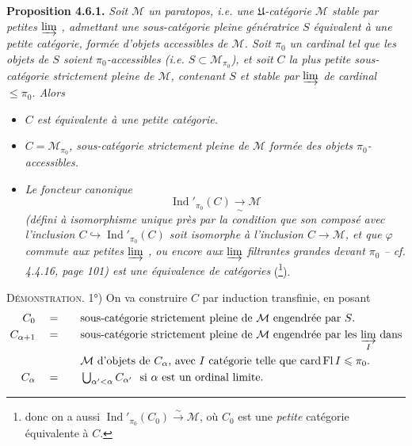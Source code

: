 \documentclass[11pt]{article}
\newcommand{\msp}[1]{\marginpar{\footnotesize [#1]}}
\newcommand{\Ind}{\operatorname{Ind}}
\begin{document}
\textbf{Proposition 4.6.1.} \textit{Soit $\mathcal{M}$ un paratopos, i.e. une $\mathfrak{U}$-catégorie $\mathcal{M}$ stable par petites $\varinjlim$ , admettant une sous-catégorie pleine génératrice $S$ équivalent à une petite catégorie, formée d'objets accessibles de $\mathcal{M}$. Soit $\pi_0$ un cardinal tel que les objets de $S$ soient $\pi_0$-accessibles (i.e. $S\subset\mathcal{M}_{\pi_0}$), et soit $C$ la plus petite sous-catégorie strictement pleine de $\mathcal{M}$, contenant $S$ et stable par $\varinjlim$ de cardinal $\leqslant\pi_0$. Alors} %
\begin{itemize}[leftmargin=2.5em]
\item[\textit{1°)}] \textit{$C$ est équivalente à une petite catégorie.}

\msp{page 140}

\item[\textit{2°)}] \textit{$C=\mathcal{M}_{\pi_0}$, sous-catégorie strictement pleine de $\mathcal{M}$ formée des objets $\pi_0$-accessibles.}
\item[\textit{3°)}] \textit{Le foncteur canonique}
\[
\Ind'_{\pi_0}(C) \xrightarrow[\sim]{} \mathcal{M} %
\]
\textit{(défini à isomorphisme unique près par la condition que son composé avec l'inclusion $C\hookrightarrow\Ind'_{\pi_0}(C)$ soit isomorphe à l'inclusion $C\longrightarrow\mathcal{M}$, et que $\varphi$ commute aux petites $\varinjlim$ , ou encore aux $\varinjlim$ filtrantes grandes devant $\pi_0$ – cf. 4.4.16, page 101) est une équivalence de catégories} (\footnote[54]{donc on a aussi $\Ind'_{\pi_0}(C_0)\xrightarrow{\ \sim\ }\mathcal{M}$, où $C_0$ est une \textit{petite} catégorie équivalente à $C$.}).
\end{itemize}

\textsc{Démonstration}. 1°) On va construire $C$ par induction transfinie, en posant
\[
\begin{aligned}
C_0 &\quad=\quad && \text{sous-catégorie strictement pleine de $\mathcal{M}$ engendrée par $S$.}\\
C_{\alpha+1} &\quad=\quad && \text{sous-catégorie strictement pleine de $\mathcal{M}$ engendrée par les $\varinjlim\limits_{I}$ dans}\\
& && \text{$\mathcal{M}$ d'objets de $C_\alpha$, avec $I$ catégorie telle que $\operatorname{card}\operatorname{Fl}I\leqslant\pi_0$.}\\
C_\alpha &\quad=\quad && \textstyle\bigcup_{\alpha'<\alpha}C_{\alpha'}\ \text{ si $\alpha$ est un ordinal limite.}
\end{aligned}
\]
\end{document}
